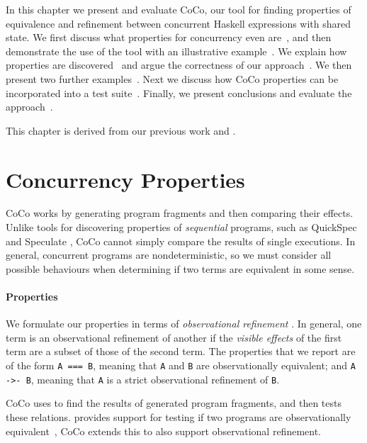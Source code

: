 In this chapter we present and evaluate CoCo, our tool for finding
properties of equivalence and refinement between concurrent Haskell
expressions with shared state.  We first discuss what properties for
concurrency even are~, and then demonstrate the
use of the tool with an illustrative example~.  We
explain how properties are discovered~ and argue the
correctness of our approach~.  We then present
two further examples~.  Next we discuss how CoCo
properties can be incorporated into a \dejafu{} test
suite~.  Finally, we present conclusions and
evaluate the approach~.

This chapter is derived from our previous work \cite{tfp-coco} and
\cite{walker2018}.

\section{Concurrency Properties}
\label{sec:coco-concerns}

CoCo works by generating program fragments and then comparing their
effects.  Unlike tools for discovering properties of \emph{sequential}
programs, such as QuickSpec \parencite{smallbone2017} and Speculate
\parencite{braquehais2017}, CoCo cannot simply compare the results of
single executions.  In general, concurrent programs are
nondeterministic, so we must consider all possible behaviours when
determining if two terms are equivalent in some sense.

\paragraph{Properties}
We formulate our properties in terms of \emph{observational
  refinement} \parencite{he1986}.  In general, one term is an
observational refinement of another if the \emph{visible effects} of
the first term are a subset of those of the second term.  The
properties that we report are of the form \verb|A === B|, meaning that
\verb|A| and \verb|B| are observationally equivalent; and
\verb|A ->- B|, meaning that \verb|A| is a strict observational
refinement of \verb|B|.

CoCo uses \dejafu{} to find the results of generated program
fragments, and then tests these relations.  \dejafu{} provides support
for testing if two programs are observationally
equivalent~, CoCo extends this to also
support observational refinement.

